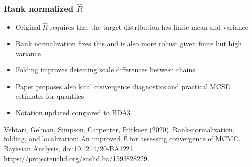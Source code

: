 \documentclass[finnish,english,t]{beamer}
\begin{document}
\begin{frame}[fragile]
  \frametitle{Rank normalized $\widehat{R}$}

  \begin{itemize}
  \item<+-> Original $\widehat{R}$ requires that the target distribution
    has finite mean and variance
  \item<+-> Rank normalization fixes this and is also more robust given
    finite but high variance
  \item<+-> Folding improves detecting scale differences between chains
  \item<+-> Paper proposes also local convergence diagnostics and
    practical MCSE estimates for quantiles
  \item<+-> Notation updated compared to BDA3 
  \end{itemize}  

    Vehtari, Gelman, Simpson, Carpenter, Bürkner
  (2020). Rank-normalization, folding, and localization: An improved
  $\widehat{R}$ for assessing convergence of MCMC. Bayesian Analysis, doi:10.1214/20-BA1221. \url{https://projecteuclid.org/euclid.ba/1593828229}.

\end{frame}

  




\end{document}

